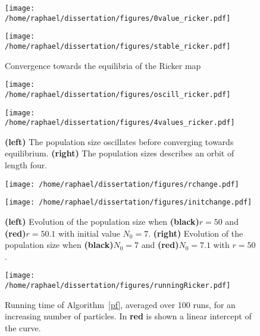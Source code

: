 \documentclass[12pt]{article}
\begin{document}
	\begin{figure}[htb]
		\centering
		\begin{minipage}{0.4\textwidth}
			\centering
			\texttt{[image: /home/raphael/dissertation/figures/0value\_ricker.pdf]}
		\end{minipage}
		\begin{minipage}{0.4\textwidth}
			\centering
			\texttt{[image: /home/raphael/dissertation/figures/stable\_ricker.pdf]}
		\end{minipage}
		\caption{Convergence towards the equilibria of the Ricker map}
		\label{fig:stab}
	\end{figure}

	\begin{figure}[htb]
		\centering
		\begin{minipage}{0.4\textwidth}
			\centering
			\texttt{[image: /home/raphael/dissertation/figures/oscill\_ricker.pdf]}
		\end{minipage}
		\begin{minipage}{0.4\textwidth}
			\centering
			\texttt{[image: /home/raphael/dissertation/figures/4values\_ricker.pdf]}
		\end{minipage}
		\caption{\textbf{(left)} The population size oscillates before converging towards equilibrium. \textbf{(right)} The population sizes describes an orbit of length four.}
		\label{fig:oscill}
	\end{figure}
	
	\begin{figure}[htb]
		\centering
		\begin{minipage}{0.4\textwidth}
			\centering
			\texttt{[image: /home/raphael/dissertation/figures/rchange.pdf]}
		\end{minipage}
		\begin{minipage}{0.4\textwidth}
			\centering
			\texttt{[image: /home/raphael/dissertation/figures/initchange.pdf]}
		\end{minipage}
		\caption{\textbf{(left)} Evolution of the population size when \textbf{(black)}$r=50$ and \textbf{(red)}$r=50.1$ with initial value $N_0=7$. \textbf{(right)} Evolution of the population size when \textbf{(black)}$N_0=7$ and \textbf{(red)}$N_0=7.1$ with $r=50$.}
		\label{fig:chaos}
	\end{figure}

	\begin{figure}[htb]
		\centering
		\begin{minipage}{0.4\textwidth}
			\centering
			\texttt{[image: /home/raphael/dissertation/figures/runningRicker.pdf]}
		\end{minipage}
		\caption{Running time of Algorithm~\ref{pf}, averaged over 100 runs, for an increasing number of particles. In \textbf{red} is shown a linear intercept of the curve.}
		\label{fig:runningRicker}
	\end{figure}
\end{document}
